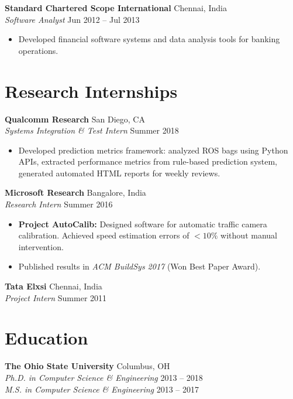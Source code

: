 \documentclass[10pt,letterpaper]{article}
\begin{document}
\textbf{Standard Chartered Scope International} \hfill Chennai, India \\
\textit{Software Analyst} \hfill Jun 2012 -- Jul 2013
\begin{itemize}
    \item Developed financial software systems and data analysis tools for banking operations.
\end{itemize}

\section{Research Internships}

\textbf{Qualcomm Research} \hfill San Diego, CA \\
\textit{Systems Integration \& Test Intern} \hfill Summer 2018
\begin{itemize}
    \item Developed prediction metrics framework: analyzed ROS bags using Python APIs, extracted performance metrics from rule-based prediction system, generated automated HTML reports for weekly reviews.
\end{itemize}

\textbf{Microsoft Research} \hfill Bangalore, India \\
\textit{Research Intern} \hfill Summer 2016
\begin{itemize}
    \item \textbf{Project AutoCalib:} Designed software for automatic traffic camera calibration. Achieved speed estimation errors of $<10\%$ without manual intervention.
    \item Published results in \textit{ACM BuildSys 2017} (Won Best Paper Award).
\end{itemize}

\textbf{Tata Elxsi} \hfill Chennai, India \\
\textit{Project Intern} \hfill Summer 2011

\section{Education}
\textbf{The Ohio State University} \hfill Columbus, OH \\
\textit{Ph.D. in Computer Science \& Engineering} \hfill 2013 -- 2018 \\
\textit{M.S. in Computer Science \& Engineering} \hfill 2013 -- 2017
\end{document}
